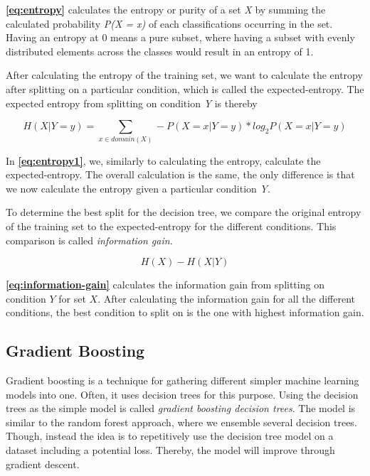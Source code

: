 \textbf{\autoref{eq:entropy}} calculates the entropy or purity of a set \textit{X} by summing the calculated probability \textit{P(X = x)} of each classifications occurring in the set. Having an entropy at 0 means a pure subset, where having a subset with evenly distributed elements across the classes would result in an entropy of 1. 

After calculating the entropy of the training set, we want to calculate the entropy after splitting on a particular condition, which is called the expected-entropy. The expected entropy from splitting on condition \textit{Y} is thereby

\begin{equation} \label{eq:entropy1}
    H(X | Y = y) = \sum_{x \in domain(X)} - P(X = x | Y = y) * log_{2} P(X = x | Y = y)
\end{equation}

In \textbf{\autoref{eq:entropy1}}, we, similarly to calculating the entropy, calculate the expected-entropy. The overall calculation is the same, the only difference is that we now calculate the entropy given a particular condition \textit{Y}.

To determine the best split for the decision tree, we compare the original entropy of the training set to the expected-entropy for the different conditions. This comparison is called \textit{information gain}.

\begin{equation} \label{eq:information-gain}
    H(X) - H(X | Y)
\end{equation}

\textbf{\autoref{eq:information-gain}} calculates the information gain from splitting on condition $Y$ for set $X$. After calculating the information gain for all the different conditions, the best condition to split on is the one with highest information gain.

\subsection{Gradient Boosting}
Gradient boosting is a technique for gathering different simpler machine learning models into one. Often, it uses decision trees for this purpose. Using the decision trees as the simple model is called \textit{gradient boosting decision trees}. The model is similar to the random forest approach, where we ensemble several decision trees. Though, instead the idea is to repetitively use the decision tree model on a dataset including a potential loss. Thereby, the model will improve through gradient descent.\cite[Chapter~12]{GradientBoosting}

